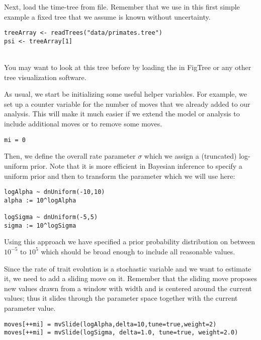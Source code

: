 Next, load the time-tree from file. Remember that we use in this first simple example a fixed tree that we assume is known without uncertainty.
{\tt \small \begin{snugshade*}
\begin{lstlisting}
treeArray <- readTrees("data/primates.tree")
psi <- treeArray[1]
\end{lstlisting}
\end{snugshade*}}
\noindent \\ \impmark You may want to look at this tree before by loading the  in FigTree or any other tree visualization software.

As usual, we start be initializing some useful helper variables.
For example, we set up a counter variable for the number of moves that we already added to our analysis.
This will make it much easier if we extend the model or analysis to include additional moves or to remove some moves.
{\tt \begin{snugshade*}
\begin{lstlisting}
mi = 0 
\end{lstlisting}
\end{snugshade*}}

Then, we define the overall rate parameter $\sigma$ which we assign a (truncated) log-uniform prior. Note that it is more efficient in Bayesian inference to specify a uniform prior and then to transform the parameter which we will use here:
{\tt \small \begin{snugshade*}
\begin{lstlisting}
logAlpha ~ dnUniform(-10,10)
alpha := 10^logAlpha

logSigma ~ dnUniform(-5,5)
sigma := 10^logSigma
\end{lstlisting}
\end{snugshade*}}
Using this approach we have specified a prior probability distribution on  between $10^{-5}$ to $10^5$ which should be broad enough to include all reasonable values.

Since the rate of trait evolution  is a stochastic variable and we want to estimate it, we need to add a sliding move on it. Remember that the sliding move proposes new values drawn from a window with width  and is centered around the current values; thus it slides through the parameter space together with the current parameter value.
{\tt \small \begin{snugshade*}
\begin{lstlisting}
moves[++mi] = mvSlide(logAlpha,delta=10,tune=true,weight=2)
moves[++mi] = mvSlide(logSigma, delta=1.0, tune=true, weight=2.0)
\end{lstlisting}
\end{snugshade*}}

